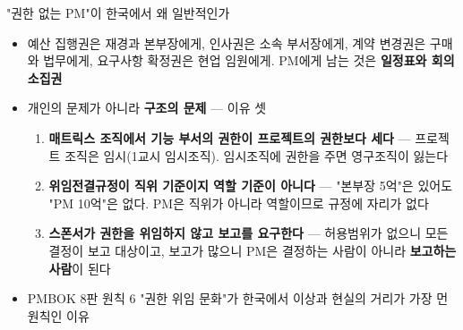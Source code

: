 \begin{frame}[allowframebreaks=1.0]{"권한 없는 PM"이 한국에서 왜 일반적인가}
\small
\begin{itemize}
\item\relax 예산 집행권은 재경과 본부장에게, 인사권은 소속 부서장에게, 계약 변경권은 구매와 법무에게, 요구사항 확정권은 현업 임원에게. PM에게 남는 것은 \textbf{일정표와 회의 소집권}
\item\relax 개인의 문제가 아니라 \textbf{구조의 문제} — 이유 셋
\par\nobreak
\begin{enumerate}
\item\relax \textbf{매트릭스 조직에서 기능 부서의 권한이 프로젝트의 권한보다 세다} — 프로젝트 조직은 임시(1교시 임시조직). 임시조직에 권한을 주면 영구조직이 잃는다
\item\relax \textbf{위임전결규정이 직위 기준이지 역할 기준이 아니다} — "본부장 5억"은 있어도 "PM 10억"은 없다. PM은 직위가 아니라 역할이므로 규정에 자리가 없다
\item\relax \textbf{스폰서가 권한을 위임하지 않고 보고를 요구한다} — 허용범위가 없으니 모든 결정이 보고 대상이고, 보고가 많으니 PM은 결정하는 사람이 아니라 \textbf{보고하는 사람}이 된다
\end{enumerate}
\item\relax PMBOK 8판 원칙 6 "권한 위임 문화"가 한국에서 이상과 현실의 거리가 가장 먼 원칙인 이유
\end{itemize}
\end{frame}

